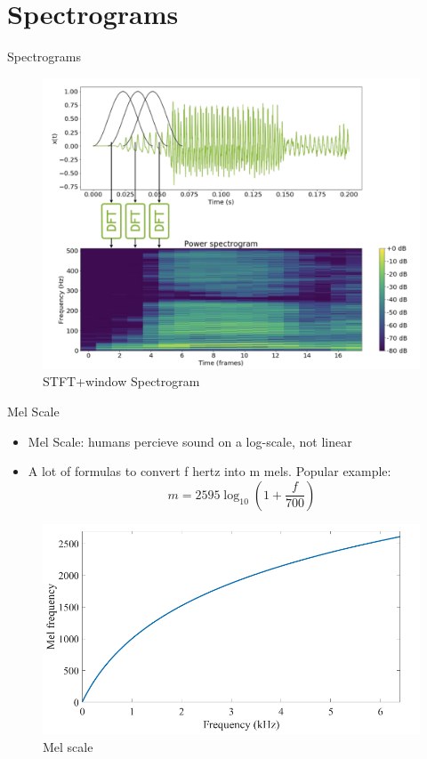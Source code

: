 \section{Spectrograms}
\begin{frame}{Spectrograms}
	\begin{figure}
		\centering
		\includegraphics[width=0.8\linewidth]{figs/stft_spec.png}
		\caption{STFT+window Spectrogram }
	\end{figure}
\end{frame}
\begin{frame}{Mel Scale}
	\begin{itemize}
		\item Mel Scale: humans percieve sound on a log-scale, not linear
		\item A lot of formulas to convert f hertz into m mels. Popular example: $$m=2595 \log _{10}\left(1+\frac{f}{700}\right)$$
	\end{itemize} 
	\begin{figure}
	\centering
	\includegraphics[width=0.8\linewidth]{figs/mel_scale.png}
	\caption{Mel scale}
\end{figure}
\end{frame}
